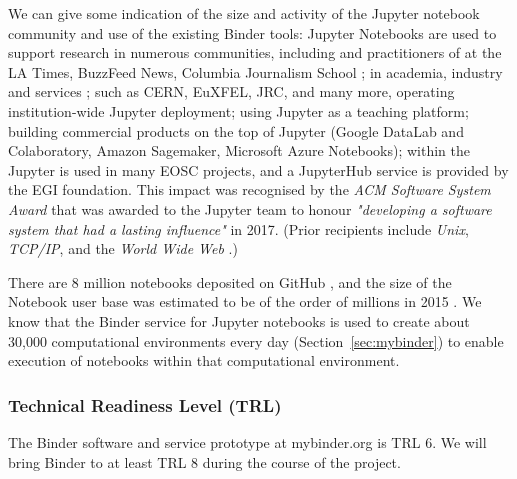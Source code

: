 We can give some indication of the size and activity of the Jupyter notebook
community and use of the existing Binder tools: Jupyter Notebooks are used to
support research in numerous communities, including
{} and practitioners of  at the LA Times, BuzzFeed News, Columbia Journalism School
\cite{latimes-datadesk} \cite{columbia-nytimes} \cite{data-journalism};
 in academia, industry and services \cite{Perkel2018};
{} such as CERN, EuXFEL, JRC, and many more,
operating institution-wide Jupyter deployment;
{} using Jupyter as a teaching platform;
{} building commercial products on the
top of Jupyter (Google DataLab and Colaboratory, Amazon Sagemaker, Microsoft Azure
Notebooks);
within the  Jupyter is used in many EOSC
projects, and a JupyterHub service is provided by the EGI foundation.
This impact was recognised by the \emph{ACM Software System Award} that was
awarded to the Jupyter team to honour \emph{"developing a software system that
had a lasting influence"} in 2017. (Prior recipients include \emph{Unix},
\emph{TCP/IP}, and the \emph{World Wide Web} \cite{acm-award}.)

There are 8 million notebooks deposited on GitHub \cite{notebookcount}, and
the size of the Notebook user base was estimated to be of the order of
millions in 2015 \cite{jupyter-grant}. We know that the Binder service for
Jupyter notebooks is used to create about 30,000 computational environments
every day (Section~\ref{sec:mybinder}) to enable execution of notebooks within
that computational environment.







\subsubsection{Technical Readiness Level (TRL)}

The Binder software and service prototype at mybinder.org is TRL 6. We will
bring Binder to at least TRL 8 during the course of the project.


